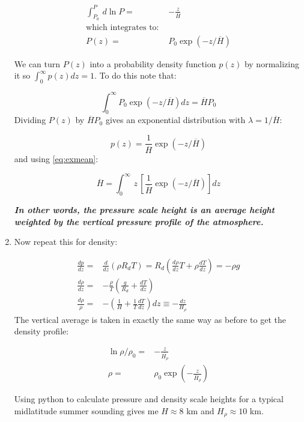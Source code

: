 \documentclass[12pt]{article}
\begin{document}
\begin{enumerate}
\begin{subequations}
  \begin{align}
  \int_{P_0}^{P}\!\,d \ln P =& -\frac{z}{\overline{H}}\\
\text{which integrates to: }\nonumber\\
P(z) =& P_0 \exp \left ( -z/\overline{H} \right )
\end{align}
\end{subequations}

We can turn $P(z)$ into a probability density function $p(z)$ by normalizing it so $\int_0^\infty p(z) dz = 1$.
To do this note that:

\begin{equation}
  \label{eq:normP}
  \int_0^\infty P_0 \exp (-z/\overline{H} ) dz = \overline{H} P_0
\end{equation}
Dividing $P(z)$ by $\overline{H} P_0$ gives an exponential distribution with $\lambda = 1/\overline{H}$:

\begin{equation}
  \label{eq:pweight}
  p(z) = \frac{1}{\overline{H}} \exp(-z/\overline{H})
\end{equation}
and using \eqref{eq:exmean}:

\begin{equation}
  \label{eq:finalscale}
  \overline{H} = \int_0^\infty\, z\,\left [ \frac{1}{\overline{H}} \exp(-z/\overline{H}) \right ] dz
\end{equation}

\textbf{\textit{In other words, the pressure scale height is an average height weighted by the vertical pressure profile of the atmosphere.
}}

\item Now repeat this for density:

  \begin{align}
 \frac{dp }{dz}  =& \frac{d }{dz}  (\rho R_d T) = R_d \left ( \frac{d\rho }{dz} T 
              + \rho \frac{ dT}{dz} \right )  = - \rho g \\
\frac{d\rho }{dz}  =& -\frac{\rho }{T}  \left ( \frac{g }{R_d} + \frac{ dT}{dz} \right )\\
\frac{d\rho }{\rho} =& - \left ( \frac{1 }{H} + 
                   \frac{1 }{T} \frac{dT }{dz} \right ) dz \equiv - \frac{dz }{H_\rho} 
  \end{align}
The vertical average is taken in exactly the same way as before to get the density profile:

\begin{align}
  \ln \rho/\rho_0 =& - \frac{z }{\overline{H_\rho }} \\
  \rho =& \rho_0 \exp \left ( - \frac{z }{\overline H_\rho} \right )
\end{align}

Using  python to calculate pressure and density scale heights for a typical midlatitude summer sounding gives
me $H\approx 8$ km and $H_\rho \approx 10$ km.


\end{enumerate}
\end{document}
